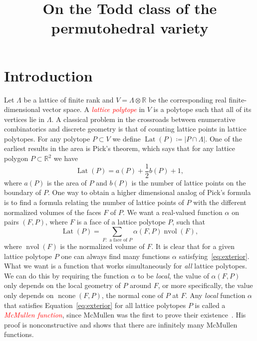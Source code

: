 \documentclass[ALCO,ThmDefs,Unicode,epreuves]{cedram}
\author{\firstname{Federico} \lastname{Castillo}}
\author{\firstname{Fu} \lastname{Liu}}
\title
[On the Todd class of the permutohedral variety]
{On the Todd class of the permutohedral variety}
\newcommand\R{{\mathbb R}}
\newcommand{\important}[1]{\emph{\textcolor{red}{#1}}}
\DeclareMathOperator{\Lat}{Lat}
\DeclareMathOperator{\nvol}{nvol}
\DeclareMathOperator{\ncone}{ncone}
\begin{document}



\maketitle


\section{Introduction}
\label{sec:in}

Let $\Lambda$ be a lattice of finite rank and $V=\Lambda\otimes\R$ be the corresponding real finite-dimensional vector space. A \important{lattice polytope} in $V$ is a polytope such that all of its vertices lie in $\Lambda$. 
A classical problem in the crossroads between enumerative combinatorics and discrete geometry is that of counting lattice points in lattice polytopes. For any polytope $P\subset V$ we define $\Lat(P)\coloneqq |P\cap\Lambda|$. One of the earliest results in the area is Pick's theorem, which says that for any lattice polygon $P\subset\R^2$ we have
\[
\Lat(P) = a(P)+\dfrac{1}{2}b(P)+1,
\]
where $a(P)$ is the area of $P$ and $b(P)$ is the number of lattice points on the boundary of $P$. One way to obtain a higher dimensional analog of Pick's formula is to find a formula relating the number of lattice points of $P$ with the different normalized volumes of the faces $F$ of $P$. We want a real-valued function $\alpha$ on pairs $(F,P)$, where $F$ is a face of a lattice polytope $P$, such that
\begin{equation}\label{eq:exterior}
\Lat(P) = \sum_{F: \text{ a face of $P$}} \alpha(F,P) \nvol(F),
\end{equation}
where $\nvol(F)$ is the normalized volume of $F$.
It is clear that for a given lattice polytope $P$ one can always find many functions $\alpha$ satisfying~\eqref{eq:exterior}. What we want is a function that works simultaneously for \emph{all} lattice polytopes. We can do this by requiring the function $\alpha$ to be \emph{local}, \ie the value of $\alpha(F,P)$ only depends on the local geometry of $P$ around $F$, or more specifically, the value only depends on $\ncone(F,P)$, the normal cone of $P$ at $F.$ Any \emph{local} function $\alpha$ that satisfies Equation~\eqref{eq:exterior} for all lattice polytopes $P$ is called a \important{McMullen function}, since McMullen was the first to prove their existence~\cite{mcmullenext}. His proof is nonconstructive and shows that there are infinitely many McMullen functions.
\end{document}
